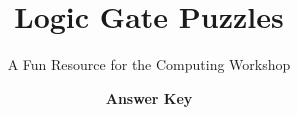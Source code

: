 \documentclass[12pt]{article}
\begin{document}
\title{Logic Gate Puzzles}
\author{A Fun Resource for the Computing Workshop}
\date{\textbf{Answer Key}}
\maketitle


\newpage




\clearpage
\newpage




\clearpage
\newpage




\clearpage
\newpage


\newpage

\end{document}
